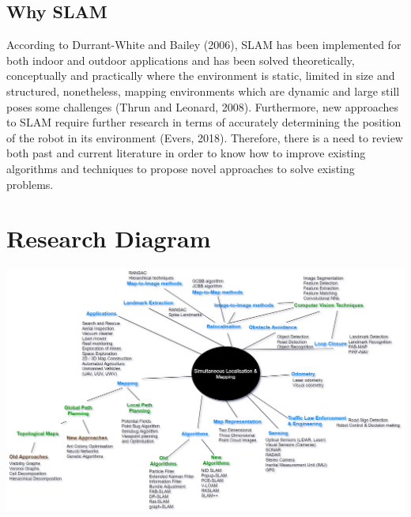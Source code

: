 \documentclass[a4paper, 12pt]{article}
\begin{document}
\subsection{Why SLAM}
According to Durrant-White and Bailey (2006), SLAM has been implemented for both indoor and outdoor applications and has been solved theoretically, conceptually and practically where the environment is static, limited in size and structured, nonetheless, mapping environments which are dynamic and large still poses some challenges (Thrun and Leonard, 2008). Furthermore, new approaches to SLAM require further research in terms of accurately determining the position of the robot in its environment (Evers, 2018).  Therefore, there is a need to review both past and current literature in order to know how to improve existing algorithms and techniques to propose novel approaches to solve existing problems.

\newpage

\section{Research Diagram}

\hspace*{-2cm}\includegraphics[width=1.3\textwidth, height= 1.1\textwidth]{rdiagram.jpg}\\[1cm]
\end{document}
